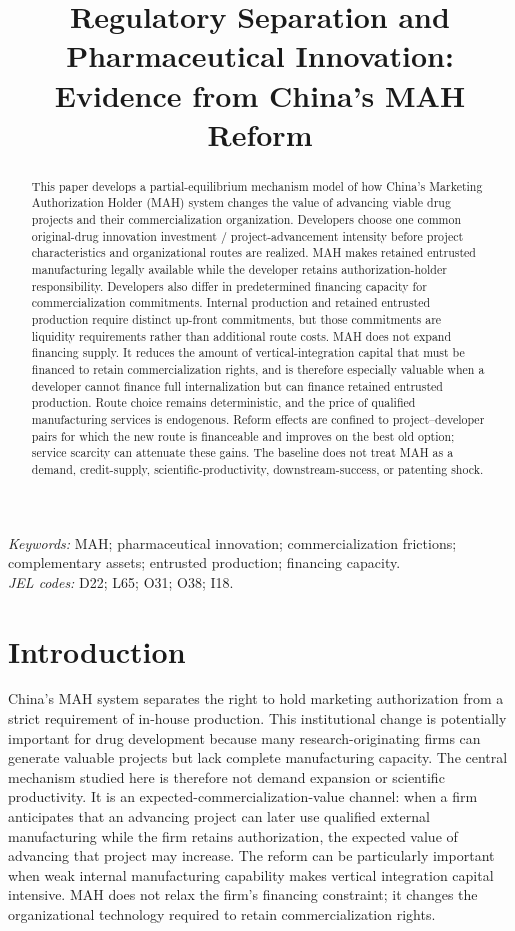 \documentclass[12pt]{article}
\title{Regulatory Separation and Pharmaceutical Innovation: Evidence from China's MAH Reform}
\author{}
\date{}
\newcommand{\1}{\mathbf{1}}
\begin{document}
\maketitle
\thispagestyle{plain}

\begin{abstract}
\noindent
This paper develops a partial-equilibrium mechanism model of how China's
Marketing Authorization Holder (MAH) system changes the value of advancing
viable drug projects and their commercialization organization. Developers
choose one common original-drug innovation investment / project-advancement
intensity before project characteristics and organizational routes are
realized. MAH makes retained entrusted manufacturing legally available while
the developer retains authorization-holder responsibility. Developers also
differ in predetermined financing capacity for commercialization commitments.
Internal production and retained entrusted production require distinct
up-front commitments, but those commitments are liquidity requirements rather
than additional route costs. MAH does not expand financing supply. It reduces
the amount of vertical-integration capital that must be financed to retain
commercialization rights, and is therefore especially valuable when a
developer cannot finance full internalization but can finance retained
entrusted production. Route choice remains deterministic, and the price of
qualified manufacturing services is endogenous. Reform effects are confined
to project--developer pairs for which the new route is financeable and improves
on the best old option; service scarcity can attenuate these gains. The
baseline does not treat MAH as a demand, credit-supply,
scientific-productivity, downstream-success, or patenting shock.
\end{abstract}

\noindent\textit{Keywords:} MAH; pharmaceutical innovation; commercialization frictions; complementary assets; entrusted production; financing capacity.\\
\noindent\textit{JEL codes:} D22; L65; O31; O38; I18.

\section{Introduction}

China's MAH system separates the right to hold marketing authorization from a
strict requirement of in-house production. This institutional change is
potentially important for drug development because many research-originating
firms can generate valuable projects but lack complete manufacturing
capacity. The central mechanism studied here is therefore not demand expansion
or scientific productivity. It is an expected-commercialization-value
channel: when a firm anticipates that an advancing project can later use
qualified external manufacturing while the firm retains authorization, the
expected value of advancing that project may increase. The reform can be
particularly important when weak internal manufacturing capability makes
vertical integration capital intensive. MAH does not relax the firm's
financing constraint; it changes the organizational technology required to
retain commercialization rights.
\end{document}
